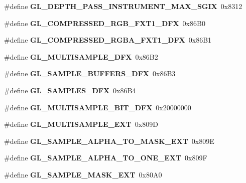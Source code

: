 \begin{DoxyCompactItemize}
\item 
\#define {\bfseries G\+L\+\_\+\+D\+E\+P\+T\+H\+\_\+\+P\+A\+S\+S\+\_\+\+I\+N\+S\+T\+R\+U\+M\+E\+N\+T\+\_\+\+M\+A\+X\+\_\+\+S\+G\+I\+X}~0x8312\label{_s_d_l__opengl_8h_afe85c63abb51391351c3a4692632a6f1}

\item 
\#define {\bfseries G\+L\+\_\+\+C\+O\+M\+P\+R\+E\+S\+S\+E\+D\+\_\+\+R\+G\+B\+\_\+\+F\+X\+T1\+\_\+D\+F\+X}~0x86\+B0\label{_s_d_l__opengl_8h_a059c06b172591c0e27cc913297d42604}

\item 
\#define {\bfseries G\+L\+\_\+\+C\+O\+M\+P\+R\+E\+S\+S\+E\+D\+\_\+\+R\+G\+B\+A\+\_\+\+F\+X\+T1\+\_\+D\+F\+X}~0x86\+B1\label{_s_d_l__opengl_8h_aec1ad65583b8165141af6675bb3dd5a1}

\item 
\#define {\bfseries G\+L\+\_\+\+M\+U\+L\+T\+I\+S\+A\+M\+P\+L\+E\+\_\+D\+F\+X}~0x86\+B2\label{_s_d_l__opengl_8h_aafae57a5a4f7a17902f3da1594fcdd24}

\item 
\#define {\bfseries G\+L\+\_\+\+S\+A\+M\+P\+L\+E\+\_\+\+B\+U\+F\+F\+E\+R\+S\+\_\+D\+F\+X}~0x86\+B3\label{_s_d_l__opengl_8h_a6d6b6d9a799c083809ea0f754b339a1e}

\item 
\#define {\bfseries G\+L\+\_\+\+S\+A\+M\+P\+L\+E\+S\+\_\+D\+F\+X}~0x86\+B4\label{_s_d_l__opengl_8h_acebe0cf342250571b717e67a02b2340c}

\item 
\#define {\bfseries G\+L\+\_\+\+M\+U\+L\+T\+I\+S\+A\+M\+P\+L\+E\+\_\+\+B\+I\+T\+\_\+D\+F\+X}~0x20000000\label{_s_d_l__opengl_8h_aa419aee3cd184688383018946b0db728}

\item 
\#define {\bfseries G\+L\+\_\+\+M\+U\+L\+T\+I\+S\+A\+M\+P\+L\+E\+\_\+\+E\+X\+T}~0x809\+D\label{_s_d_l__opengl_8h_afad1c9789883e41bbc5c46800b9ea75e}

\item 
\#define {\bfseries G\+L\+\_\+\+S\+A\+M\+P\+L\+E\+\_\+\+A\+L\+P\+H\+A\+\_\+\+T\+O\+\_\+\+M\+A\+S\+K\+\_\+\+E\+X\+T}~0x809\+E\label{_s_d_l__opengl_8h_ac5e63b7e3a6d7e6077abd1b0928d5703}

\item 
\#define {\bfseries G\+L\+\_\+\+S\+A\+M\+P\+L\+E\+\_\+\+A\+L\+P\+H\+A\+\_\+\+T\+O\+\_\+\+O\+N\+E\+\_\+\+E\+X\+T}~0x809\+F\label{_s_d_l__opengl_8h_ae88b3a2be6a94fe1da034561d3a56c57}

\item 
\#define {\bfseries G\+L\+\_\+\+S\+A\+M\+P\+L\+E\+\_\+\+M\+A\+S\+K\+\_\+\+E\+X\+T}~0x80\+A0\label{_s_d_l__opengl_8h_a0981985e5742933b6f57389f22b95945}


\end{DoxyCompactItemize}
